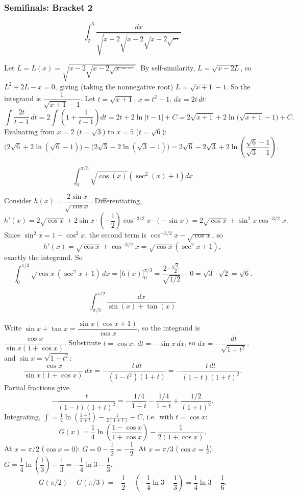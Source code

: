 \subsubsection*{Semifinals: Bracket 2}
\begin{questions}

\question \[\int_2^5 \frac{dx}{\sqrt{x-2\sqrt{x-2\sqrt{x-2\sqrt{\cdots}}}}}\]
\begin{solution}
Let $L=L(x)=\sqrt{x-2\sqrt{x-2\sqrt{x-\cdots}}}$. By self-similarity, $L=\sqrt{x-2L}$, so $L^2+2L-x=0$, giving (taking the nonnegative root) $L=\sqrt{x+1}-1$.
So the integrand is $\dfrac{1}{\sqrt{x+1}-1}$. Let $t=\sqrt{x+1}$, $x=t^2-1$, $dx=2t\,dt$:
\[
\int \frac{2t}{t-1}\,dt=2\int\left(1+\frac{1}{t-1}\right)dt=2t+2\ln|t-1|+C=2\sqrt{x+1}+2\ln\big(\sqrt{x+1}-1\big)+C.
\]
Evaluating from $x=2$ ($t=\sqrt3$) to $x=5$ ($t=\sqrt6$):
\[
\Big(2\sqrt6+2\ln(\sqrt6-1)\Big)-\Big(2\sqrt3+2\ln(\sqrt3-1)\Big)=2\sqrt6-2\sqrt3+2\ln\!\left(\frac{\sqrt6-1}{\sqrt3-1}\right).
\]
\end{solution}

\question \[\int_0^{\pi/3} \sqrt{\cos(x)}\left(\sec^2(x)+1\right)dx\]
\begin{solution}
Consider $h(x)=\dfrac{2\sin x}{\sqrt{\cos x}}$. Differentiating,
\[
h'(x)=2\sqrt{\cos x}+2\sin x\cdot\left(-\frac12\right)\cos^{-3/2}x\cdot(-\sin x)=2\sqrt{\cos x}+\sin^2x\cos^{-3/2}x.
\]
Since $\sin^2x=1-\cos^2x$, the second term is $\cos^{-3/2}x-\sqrt{\cos x}$, so
\[
h'(x)=\sqrt{\cos x}+\cos^{-3/2}x=\sqrt{\cos x}\left(\sec^2x+1\right),
\]
exactly the integrand. So
\[
\int_0^{\pi/3}\sqrt{\cos x}(\sec^2x+1)\,dx=\Big[h(x)\Big]_0^{\pi/3}=\frac{2\cdot\frac{\sqrt3}{2}}{\sqrt{1/2}}-0=\sqrt3\cdot\sqrt2=\sqrt6.
\]
\end{solution}

\question \[\int_{\pi/3}^{\pi/2} \frac{dx}{\sin(x)+\tan(x)}\]
\begin{solution}
Write $\sin x+\tan x=\dfrac{\sin x(\cos x+1)}{\cos x}$, so the integrand is $\dfrac{\cos x}{\sin x(1+\cos x)}$.
Substitute $t=\cos x$, $dt=-\sin x\,dx$, so $dx=-\dfrac{dt}{\sqrt{1-t^2}}$, and $\sin x=\sqrt{1-t^2}$:
\[
\frac{\cos x}{\sin x(1+\cos x)}\,dx=-\frac{t\,dt}{(1-t^2)(1+t)}=-\frac{t\,dt}{(1-t)(1+t)^2}.
\]
Partial fractions give
\[
-\frac{t}{(1-t)(1+t)^2}=-\frac{1/4}{1-t}-\frac{1/4}{1+t}+\frac{1/2}{(1+t)^2}.
\]
Integrating, $\displaystyle\int = \frac14\ln\!\left(\frac{1-t}{1+t}\right)-\frac{1}{2(1+t)}+C$, i.e.\ with $t=\cos x$:
\[
G(x)=\frac14\ln\!\left(\frac{1-\cos x}{1+\cos x}\right)-\frac{1}{2(1+\cos x)}.
\]
At $x=\pi/2$ ($\cos x=0$): $G=0-\dfrac12=-\dfrac12$.
At $x=\pi/3$ ($\cos x=\tfrac12$): $G=\dfrac14\ln\!\left(\dfrac13\right)-\dfrac13=-\dfrac14\ln3-\dfrac13$.
\[
G(\pi/2)-G(\pi/3)=-\frac12-\left(-\frac14\ln3-\frac13\right)=\frac14\ln3-\frac16.
\]
\end{solution}

\end{questions}

